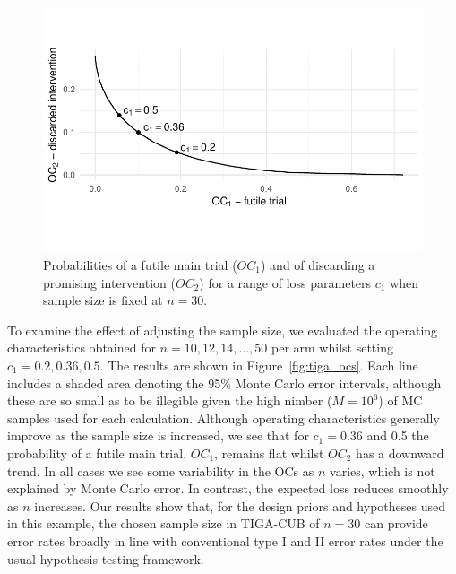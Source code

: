 \documentclass[AMA,STIX1COL]{WileyNJD-v2}
\begin{document}
\begin{figure}
\centering
\includegraphics[scale=0.8]{./figures/tiga_n30}
\caption{Probabilities of a futile main trial ($OC_1$) and of discarding a promising intervention ($OC_2$) for a range of loss parameters $c_1$ when sample size is fixed at $n=30$.}
\label{fig:tiga_n60}
\end{figure}

%

To examine the effect of adjusting the sample size, we evaluated the operating characteristics obtained for $n = 10, 12, 14, \ldots , 50$ per arm whilst setting $c_1 = 0.2, 0.36, 0.5$. The results are shown in Figure~\ref{fig:tiga_ocs}. Each line includes a shaded area denoting the 95\% Monte Carlo error intervals, although these are so small as to be illegible given the high nimber ($M = 10^6$) of MC samples used for each calculation. Although operating characteristics generally improve as the sample size is increased, we see that for $c_1 = 0.36$ and 0.5 the probability of a futile main trial, $OC_1$, remains flat whilst $OC_2$ has a downward trend. In all cases we see some variability in the OCs as $n$ varies, which is not explained by Monte Carlo error. In contrast, the expected loss reduces smoothly as $n$ increases. Our results show that, for the design priors and hypotheses used in this example, the chosen sample size in TIGA-CUB of $n=30$ can provide error rates broadly in line with conventional type I and II error rates under the usual hypothesis testing framework. 
\end{document}
